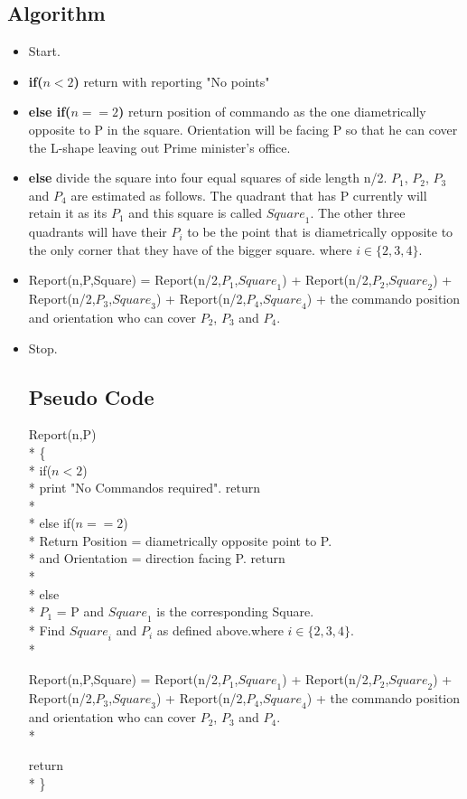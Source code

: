 \documentclass{article}
\begin{document}
\subsection{Algorithm}
\begin{itemize}
\item Start.
\item {\bf if($n<2$)} return with reporting "No points"
\item {\bf else if($n==2$)} return position of commando as the one diametrically opposite to P in the square. Orientation will be facing P so that he can cover the L-shape leaving out Prime minister's office.
\item {\bf else} divide the square into four equal squares of side length n/2. $P_1$, $P_2$, $P_3$ and $P_4$ are estimated as follows. The quadrant that has P currently will retain it as its $P_1$ and this square is called ${Square}_1$. The other three quadrants will have their $P_i$ to be the point that is diametrically opposite to the only corner that they have of the bigger square. where $ i \in \{2,3,4\} $.
\item Report(n,P,Square) = Report(n/2,$P_1$,${Square}_1$) + Report(n/2,$P_2$,${Square}_2$) + Report(n/2,$P_3$,${Square}_3$) + Report(n/2,$P_4$,${Square}_4$) + the commando position and orientation who can cover $P_2$, $P_3$ and $P_4$. 
\item Stop.
\subsection{Pseudo Code}
Report(n,P)	\\*
\{			\\*
	\hspace*{1cm}if($n<2$) \\*
	\hspace*{2cm} print "No Commandos required". return \\*
	\\*
	\hspace*{1cm}else if($n==2$)\\*
	\hspace*{2cm}Return Position =  diametrically opposite point to P. \\*
	\hspace*{2cm}and Orientation = direction facing P. return\\*
	\\*
	\hspace*{1cm}else \\*
	\hspace*{2cm}$P_1$ = P and ${Square}_1$ is the corresponding Square.\\*
	\hspace*{2cm}Find ${Square}_i$ and $P_i$ as defined above.where $ i \in \{2,3,4\} $.\\*
	\begin{center}
	Report(n,P,Square) = Report(n/2,$P_1$,${Square}_1$) + Report(n/2,$P_2$,${Square}_2$) + Report(n/2,$P_3$,${Square}_3$) + Report(n/2,$P_4$,${Square}_4$) + the commando position and orientation who can cover $P_2$, $P_3$ and $P_4$. \\*
	\end{center}
	\hspace*{1cm}return \\*
\}

\end{itemize}
\end{document}
